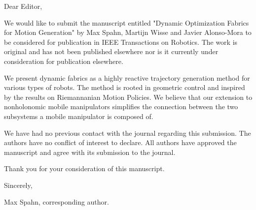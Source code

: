 Dear Editor,

We would like to submit the manuscript entitled "Dynamic Optimization Fabrics
for Motion Generation" by Max Spahn, Martijn Wisse and Javier Alonso-Mora to be
considered for publication in IEEE Transactions on Robotics. The work is
original and has not been published elsewhere nor is it currently under
consideration for publication elsewhere.

We present dynamic fabrics as a highly reactive trajectory generation method
for various types of robots. The method is rooted in geometric control and
inspired by the results on Riemannanian Motion Policies. We believe that
our extension to nonholonomic mobile manipulators simplifies the connection
between the two subsystems a mobile manipulator is composed of.

We have had no previous contact with the journal regarding this submission. The
authors have no conflict of interest to declare. All authors have approved the
manuscript and agree with its submission to the journal.

Thank you for your consideration of this manuscript.

Sincerely,

Max Spahn, corresponding author.
